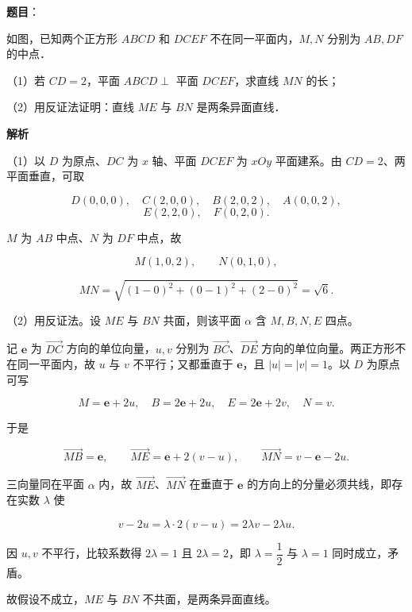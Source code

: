 \begin{answer}

\textbf{题目}：

如图，已知两个正方形 $ABCD$ 和 $DCEF$ 不在同一平面内，$M,N$ 分别为 $AB,DF$ 的中点．

（1）若 $CD=2$，平面 $ABCD\perp$ 平面 $DCEF$，求直线 $MN$ 的长；

（2）用反证法证明：直线 $ME$ 与 $BN$ 是两条异面直线．
\nopagebreak[4]
\begin{center}\end{center}
\nopagebreak[4]
\textbf{解析}

（1）以 $D$ 为原点、$DC$ 为 $x$ 轴、平面 $DCEF$ 为 $xOy$ 平面建系。由 $CD=2$、两平面垂直，可取

\nopagebreak[4]
\[D(0,0,0),\quad C(2,0,0),\quad B(2,0,2),\quad A(0,0,2),\]
\nopagebreak[4]
\[E(2,2,0),\quad F(0,2,0).\]

$M$ 为 $AB$ 中点、$N$ 为 $DF$ 中点，故

\nopagebreak[4]
\[M(1,0,2),\qquad N(0,1,0),\]

\nopagebreak[4]
\[MN=\sqrt{(1-0)^2+(0-1)^2+(2-0)^2}=\sqrt6 .\]

（2）用反证法。设 $ME$ 与 $BN$ 共面，则该平面 $\alpha$ 含 $M,B,N,E$ 四点。

记 $\boldsymbol e$ 为 $\overrightarrow{DC}$ 方向的单位向量，$u,v$ 分别为 $\overrightarrow{BC}$、$\overrightarrow{DE}$ 方向的单位向量。两正方形不在同一平面内，故 $u$ 与 $v$ 不平行；又都垂直于 $\boldsymbol e$，且 $|u|=|v|=1$。以 $D$ 为原点可写

\nopagebreak[4]
\[M=\boldsymbol e+2u,\quad B=2\boldsymbol e+2u,\quad E=2\boldsymbol e+2v,\quad N=v .\]

于是

\nopagebreak[4]
\[\overrightarrow{MB}=\boldsymbol e,\qquad
\overrightarrow{ME}=\boldsymbol e+2(v-u),\qquad
\overrightarrow{MN}=v-\boldsymbol e-2u .\]

三向量同在平面 $\alpha$ 内，故 $\overrightarrow{ME}$、$\overrightarrow{MN}$ 在垂直于 $\boldsymbol e$ 的方向上的分量必须共线，即存在实数 $\lambda$ 使

\nopagebreak[4]
\[v-2u=\lambda\cdot2(v-u)=2\lambda v-2\lambda u .\]

因 $u,v$ 不平行，比较系数得 $2\lambda=1$ 且 $2\lambda=2$，即 $\lambda=\dfrac12$ 与 $\lambda=1$ 同时成立，矛盾。

故假设不成立，$ME$ 与 $BN$ 不共面，是两条异面直线。


\end{answer}
